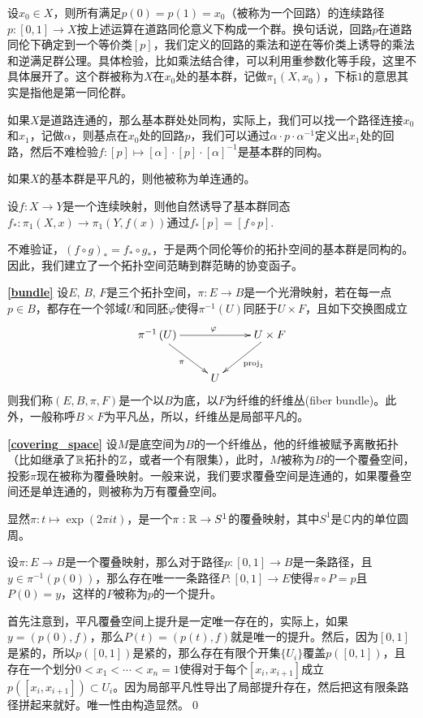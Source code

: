 \para 设$x_0\in X$，则所有满足$p(0)=p(1)=x_0$（被称为一个{\kaishu 回路}）的连续路径$p:[0,1]\to X$按上述运算在道路同伦意义下构成一个群。换句话说，回路$p$在道路同伦下确定到一个等价类$[p]$，我们定义的回路的乘法和逆在等价类上诱导的乘法和逆满足群公理。具体检验，比如乘法结合律，可以利用重参数化等手段，这里不具体展开了。这个群被称为$X$在$x_0$处的{\kaishu 基本群}，记做$\pi_1(X,x_0)$，下标$1$的意思其实是指他是第一同伦群。

如果$X$是道路连通的，那么基本群处处同构，实际上，我们可以找一个路径连接$x_0$和$x_1$，记做$\alpha$，则基点在$x_0$处的回路$p$，我们可以通过$\alpha \cdot p \cdot \alpha^{-1}$定义出$x_1$处的回路，然后不难检验$f:[p]\mapsto [\alpha] \cdot [p] \cdot [\alpha]^{-1}$是基本群的同构。

如果$X$的基本群是平凡的，则他被称为{\kaishu 单连通}的。

\para 设$f:X\to Y$是一个连续映射，则他自然诱导了基本群同态$f_*:\pi_1(X,x)\to \pi_1(Y,f(x))$通过$f_*[p]=[f\circ p]$.

不难验证，$(f\circ g)_*=f_*\circ g_*$，于是两个同伦等价的拓扑空间的基本群是同构的。因此，我们建立了一个拓扑空间范畴到群范畴的协变函子。

\textbf{\eqref{bundle}} 设$E$, $B$, $F$是三个拓扑空间，$\pi:E\to B$是一个光滑映射，若在每一点$p\in B$，都存在一个邻域$U$和同胚$\varphi$使得$\pi^{-1}(U)$同胚于$U \times F$，且如下交换图成立
\[
	\xymatrix{
		\pi^{-1}\left(U\right)\ar[rr]^\varphi \ar[dr]_\pi&&U\times F \ar[dl]^{\mathrm{proj}_1}\\
		&U&
		}
\]
则我们称$(E, B, \pi, F)$是一个以$B$为底，以$F$为纤维的{\kaishu 纤维丛}(fiber bundle)。此外，一般称呼$B\times F$为平凡丛，所以，纤维丛是局部平凡的。

\textbf{\eqref{covering_space}} 设$M$是底空间为$B$的一个纤维丛，他的纤维被赋予离散拓扑（比如继承了$\mathbb{R}$拓扑的$\mathbb{Z}$，或者一个有限集），此时，$M$被称为$B$的一个覆叠空间，投影$\pi$现在被称为覆叠映射。一般来说，我们要求覆叠空间是连通的，如果覆叠空间还是单连通的，则被称为万有覆叠空间。

显然$\pi:t\mapsto \exp(2\pi it)$，是一个$\pi:\mathbb{R} \to S^1$的覆叠映射，其中$S^1$是$\mathbb{C}$内的单位圆周。

\pro 设$\pi:E\to B$是一个覆叠映射，那么对于路径$p:[0,1]\to B$是一条路径，且$y\in \pi^{-1}(p(0))$，那么存在唯一一条路径$P:[0,1]\to E$使得$\pi\circ P=p$且$P(0)=y$，这样的$P$被称为$p$的一个提升。

\proof 首先注意到，平凡覆叠空间上提升是一定唯一存在的，实际上，如果$y=(p(0),f)$，那么$P(t)=(p(t),f)$就是唯一的提升。然后，因为$[0,1]$是紧的，所以$p([0,1])$是紧的，那么存在有限个开集$\{U_i\}$覆盖$p([0,1])$，且存在一个划分$0<x_1<\cdots<x_n=1$使得对于每个$[x_i,x_{i+1}]$成立$p([x_i,x_{i+1}])\subset U_i$。因为局部平凡性导出了局部提升存在，然后把这有限条路径拼起来就好。唯一性由构造显然。\qed

